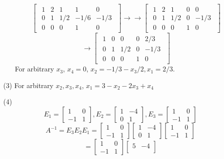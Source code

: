 \begin{itemize}
\begin{itemize}
$$\begin{bmatrix}
\begin{array}{cccc|c}
1 & 2 & 1 & 1 & 0 \\
0 & 1 & 1/2 & -1/6 & -1/3 \\
0 & 0 & 0 & 1 & 0
\end{array}
\end{bmatrix}\rightarrow\rightarrow \begin{bmatrix}
\begin{array}{cccc|c}
1 & 2 & 1 & 0 & 0 \\
0 & 1 & 1/2 & 0 & -1/3 \\
0 & 0 & 0 & 1 & 0
\end{array}
\end{bmatrix}$$
$$\rightarrow \begin{bmatrix}
\begin{array}{cccc|c}
1 & 0 & 0 & 0 & 2/3 \\
0 & 1 & 1/2 & 0 & -1/3 \\
0 & 0 & 0 & 1 & 0
\end{array}
\end{bmatrix}$$
For arbitrary $x_3$, $x_4 = 0$, $x_2 = -1/3 - x_3/2, x_1 = 2/3$.
\end{itemize}
\item[(3)]
For arbitrary $x_2, x_3, x_4$, $x_1 = 3 - x_2 - 2x_3 + x_4$
\item[(4)]
$$E_1 = \begin{bmatrix}
1 & 0 \\
-1 & 1
\end{bmatrix}, E_2 = \begin{bmatrix}
1 & -4 \\
0 & 1
\end{bmatrix}, E_3 = \begin{bmatrix}
1 & 0 \\
-1 & 1
\end{bmatrix}$$
$$A^{-1} = E_3E_2E_1 = \begin{bmatrix}
1 & 0 \\
-1 & 1
\end{bmatrix}\begin{bmatrix}
1 & -4 \\
0 & 1
\end{bmatrix}\begin{bmatrix}
1 & 0 \\
-1 & 1
\end{bmatrix}$$
$$= \begin{bmatrix}
1 & 0 \\
-1 & 1
\end{bmatrix}\begin{bmatrix}
5 & -4 \\

\end{bmatrix}$$
\end{itemize}
